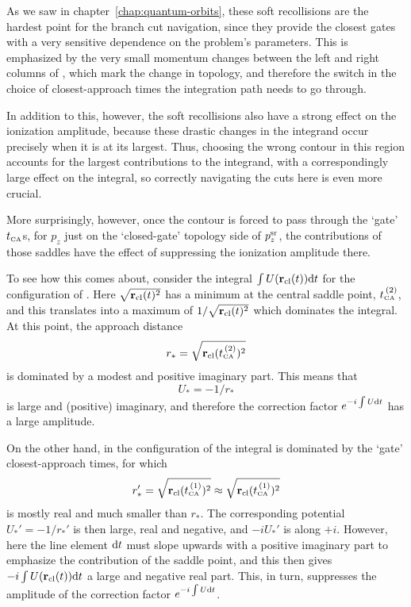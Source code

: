 As we saw in chapter~\ref{chap:quantum-orbits}, these soft recollisions are the hardest point for the branch cut navigation, since they provide the closest gates with a very sensitive dependence on the problem's parameters. This is emphasized by the very small momentum changes between the left and right columns of , which mark the change in topology, and therefore the switch in the choice of closest-approach times the integration path needs to go through.

In addition to this, however, the soft recollisions also have a strong effect on the ionization amplitude, because these drastic changes in the integrand occur precisely when it is at its largest. Thus, choosing the wrong contour in this region accounts for the largest contributions to the integrand, with a correspondingly large effect on the integral, so correctly navigating the cuts here is even more crucial. 

More surprisingly, however, once the contour is forced to pass through the `gate' ${t_{\scriptscriptstyle\mathrm{CA}}}$s, for $p_z$ just on the `closed-gate' topology side of $p_z^{\mathrm{sr}}$, the contributions of those saddles have the effect of suppressing the ionization amplitude there.

To see how this comes about, consider the integral $\int U(\vb{r}_{\mathrm{cl}}(t))\mathrm{d} t$ for the configuration of . Here $\sqrt{\vb{r}_{\mathrm{cl}}(t)^2}$ has a minimum at the central saddle point, ${t_{\scriptscriptstyle\mathrm{CA}}^{{\,(2)}}}$, and this translates into a maximum of $1/\sqrt{\vb{r}_{\mathrm{cl}}(t)^2}$ which dominates the integral. At this point, the approach distance 
\begin{equation}
r_\ast=\sqrt{\vb{r}_{\mathrm{cl}}({t_{\scriptscriptstyle\mathrm{CA}}^{{\,(2)}}})^2}
\end{equation}
is dominated by a modest and positive imaginary part. This means that 
\begin{equation}
U_\ast=-1/r_\ast
\end{equation}
is large and (positive) imaginary, and therefore the correction factor $e^{-i\int U\mathrm{d} t}$ has a large amplitude.

On the other hand, in the configuration of  the integral is dominated by the `gate' closest-approach times, for  which
\begin{equation}
r_\ast'=\sqrt{\vb{r}_{\mathrm{cl}}({t_{\scriptscriptstyle\mathrm{CA}}^{{\,(1)}}})^2}\approx\sqrt{\vb{r}_{\mathrm{cl}}({t_{\scriptscriptstyle\mathrm{CA}}^{{\,(1)}}})^2}
\end{equation} 
is mostly real and much smaller than $r_\ast$. The corresponding potential $U_\ast'=-1/r_\ast'$ is then large, real and negative, and $-iU_\ast'$ is along $+i$. However, here the line element $\mathrm{d} t$ must slope upwards with a positive imaginary part to emphasize the contribution of the saddle point, and this then gives $-i\int U(\vb{r}_{\mathrm{cl}}(t))\mathrm{d} t$ a large and negative real part. This, in turn, suppresses the amplitude of the correction factor $e^{-i\int U\mathrm{d} t}$. 




